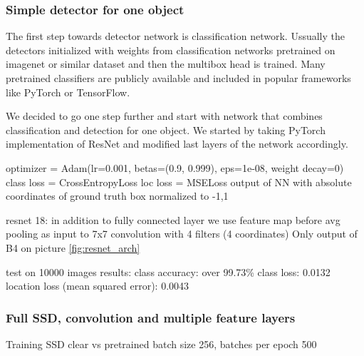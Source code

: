 \subsubsection{Simple detector for one object}
The first step towards detector network is classification network. Ussually the detectors initialized with weights from classification networks pretrained on imagenet or similar dataset and then the multibox head is trained. Many pretrained classifiers are publicly available and included in popular frameworks like PyTorch or TensorFlow.

We decided  to go one step further and start with network that combines classification and detection for one object. We started by taking PyTorch implementation of ResNet and modified last layers of the network accordingly. 


optimizer = Adam(lr=0.001, betas=(0.9, 0.999), eps=1e-08, weight decay=0)
class loss = CrossEntropyLoss
loc loss = MSELoss output of NN with absolute coordinates of ground truth box normalized to -1,1 

resnet 18: in addition to fully connected layer we use feature map before avg pooling as input to 7x7 convolution with 4 filters (4 coordinates) Only output of B4 on picture \cref{fig:resnet_arch} 

test on 10000 images
results: class accuracy: over 99.73\%
class loss: 0.0132
location loss (mean squared error): 0.0043



\subsubsection{Full SSD, convolution and multiple feature layers}
Training SSD clear vs pretrained
batch size 256, batches per epoch 500




